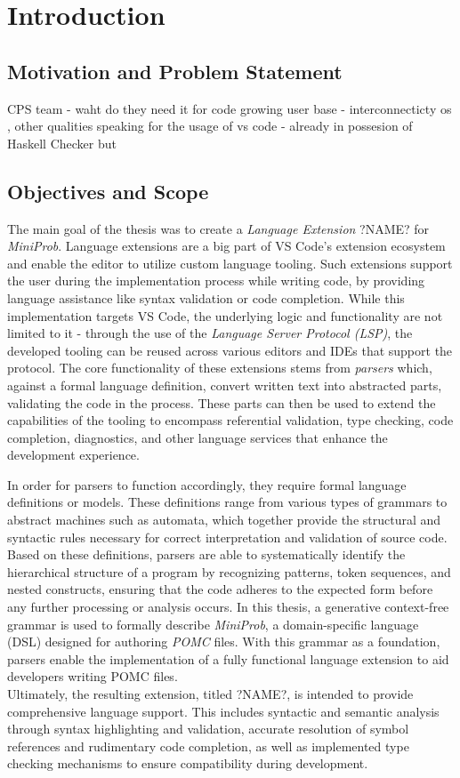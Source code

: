 \chapter{Introduction}
\section{Motivation and Problem Statement}

CPS team - waht do they need it for
code growing user base - interconnecticty os , other qualities speaking for the usage of vs code
-
already in possesion of Haskell Checker but

\label{sec:scope}
\section{Objectives and Scope}
The main goal of the thesis was to create a \textit{Language Extension} ?NAME? for \textit{MiniProb}. Language extensions are a big part of
VS Code’s extension ecosystem and enable the editor to utilize custom language tooling. Such extensions support the user during the implementation process
while writing code, by providing language assistance like syntax validation or code completion. While this implementation targets VS Code, the underlying
logic and functionality are not limited to it - through the use of the \textit{Language Server Protocol (LSP)}, the developed tooling can be reused across
various editors and IDEs that support the protocol. The core functionality of these extensions stems from \textit{parsers} which, against a formal language
definition, convert written text into abstracted parts, validating the code in the process. These parts can then be used to extend the capabilities of the
tooling to encompass referential validation, type checking, code completion, diagnostics, and other language services that enhance the development experience.

In order for parsers to function accordingly, they require formal language definitions or models. These definitions range from various types of grammars to
abstract machines such as automata, which together provide the structural and syntactic rules necessary for correct interpretation and validation of source code.
Based on these definitions, parsers are able to systematically identify the hierarchical structure of a program by recognizing patterns, token sequences, and nested
constructs, ensuring that the code adheres to the expected form before any further processing or analysis occurs.
In this thesis, a generative context-free grammar is used to formally describe \textit{MiniProb}, a domain-specific language (DSL) designed for authoring \textit{POMC} files.
With this grammar as a foundation, parsers enable the implementation of a fully functional language extension to aid developers writing POMC files.\\
Ultimately, the resulting extension, titled ?NAME?, is intended to provide comprehensive language support. This includes syntactic and semantic analysis
through syntax highlighting and validation, accurate resolution of symbol references and rudimentary code completion, as well as implemented type checking mechanisms
to ensure compatibility during development.

